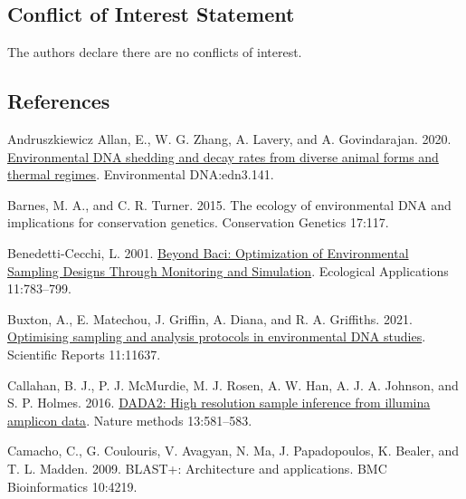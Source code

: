 \documentclass[
]{article}
\newlength{\cslhangindent}
\newlength{\cslentryspacingunit} %
\newenvironment{CSLReferences}[2] %
 {%
  \setlength{\parindent}{0pt}
  \ifodd #1
  \let\oldpar\par
  \def\par{\hangindent=\cslhangindent\oldpar}
  \fi
  \setlength{\parskip}{#2\cslentryspacingunit}
 }%
 {}
\begin{document}
\hypertarget{conflict-of-interest-statement}{%
\subsection{Conflict of Interest
Statement}\label{conflict-of-interest-statement}}

The authors declare there are no conflicts of interest.

\newpage

\hypertarget{references}{%
\subsection*{References}\label{references}}

\hypertarget{refs}{}
\begin{CSLReferences}{1}{0}
\leavevmode{}%
Andruszkiewicz Allan, E., W. G. Zhang, A. Lavery, and A. Govindarajan.
2020. \href{https://doi.org/10.1002/edn3.141}{Environmental DNA shedding
and decay rates from diverse animal forms and thermal regimes}.
Environmental DNA:edn3.141.

\leavevmode{}%
Barnes, M. A., and C. R. Turner. 2015. The ecology of environmental DNA
and implications for conservation genetics. Conservation Genetics
17:117.

\leavevmode{}%
Benedetti-Cecchi, L. 2001.
\href{https://doi.org/10.1890/1051-0761(2001)011\%5B0783:BBOOES\%5D2.0.CO;2}{Beyond
Baci: Optimization of Environmental Sampling Designs Through Monitoring
and Simulation}. Ecological Applications 11:783--799.

\leavevmode{}%
Buxton, A., E. Matechou, J. Griffin, A. Diana, and R. A. Griffiths.
2021. \href{https://doi.org/10.1038/s41598-021-91166-7}{Optimising
sampling and analysis protocols in environmental DNA studies}.
Scientific Reports 11:11637.

\leavevmode{}%
Callahan, B. J., P. J. McMurdie, M. J. Rosen, A. W. Han, A. J. A.
Johnson, and S. P. Holmes. 2016.
\href{https://doi.org/10.1038/nmeth.3869}{DADA2: High resolution sample
inference from illumina amplicon data}. Nature methods 13:581--583.

\leavevmode{}%
Camacho, C., G. Coulouris, V. Avagyan, N. Ma, J. Papadopoulos, K.
Bealer, and T. L. Madden. 2009. BLAST+: Architecture and applications.
BMC Bioinformatics 10:4219.


\end{CSLReferences}
\end{document}
